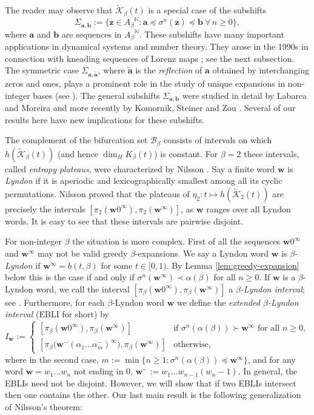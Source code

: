 \documentclass[11pt]{amsart}
\theoremstyle{definition}
\theoremstyle{remark}
\numberwithin{equation}{section}
\newcommand{\N}{\ensuremath{\mathbb{N}}}
\newcommand{\BB}{\mathscr{B}}
\newcommand{\Kt}{\widetilde{\mathcal{K}}}
\renewcommand{\a}{ {\mathbf{a}}}
\renewcommand{\b}{ {\mathbf{b}}}
\newcommand{\w}{\mathbf{w}}
\newcommand{\z}{\mathbf{z}}
\newcommand{\f}{\infty}
\newcommand{\al}{\alpha}
\newcommand{\lle}{\preccurlyeq}
\renewcommand{\a}{ \mathbf{a}}
\newcommand{\si}{\sigma}
\begin{document}
\medskip
The reader may observe that $\Kt_\beta(t)$ is a special case of the subshifts
\begin{equation} \label{eq:Sigma-ab}
\Sigma_{\a,\b}:=\{\z\in{A_\beta}^\N: \a\lle \si^n(\z)\lle \b\ \forall\,n\geq 0\},
\end{equation}
where $\a$ and $\b$ are sequences in ${A_\beta}^\N$. These subshifts have many important applications in dynamical systems and number theory. They arose in the 1990s in connection with kneading sequences of Lorenz maps \cite{Glendinning-Hall-1996,Glendinning-Sparrow-1993,Hubbard-Sparrow-1990}; see the next subsection. The symmetric case $\Sigma_{\a,\tilde{\a}}$, where $\tilde{\a}$ is the {\em reflection} of $\a$ obtained by interchanging zeros and ones, plays a prominent role in the study of unique expansions in non-integer bases (see \cite{AlcarazBarrera-Baker-Kong-2016, Allaart-2017, Allaart-Baker-Kong-17, Darczy_Katai_1995, DeVries_Komornik_2008, Erdos_Joo_Komornik_1990, Glendinning_Sidorov_2001, Komornik-Kong-Li-17}).  The general subshifts $\Sigma_{\a,\b}$ were studied in detail by Labarca and Moreira \cite{Labarca-Moreira-2006} and more recently by Komornik, Steiner and Zou \cite{Komornik-Steiner-Zou-2022}. Several of our results here have new implications for these subshifts.

The complement of the bifurcation set $\BB_\beta$ consists of intervals on which $h(\Kt_\beta(t))$ (and hence $\dim_H K_\beta(t)$) is constant. For $\beta=2$ these intervals, called {\em entropy plateaus}, were characterized by Nilsson \cite{Nilsson-2009}. Say a finite word $\w$ is {\em Lyndon} if it is aperiodic and lexicographically smallest among all its cyclic permutations. Nilsson proved that the plateaus of $\eta_2: t\mapsto h(\Kt_2(t))$ are precisely the intervals $[\pi_2(\w0^\f),\pi_2(\w^\f)]$, as $\w$ ranges over all Lyndon words. It is easy to see that these intervals are pairwise disjoint.

For {non-integer $\beta$} the situation is more complex. First of all the sequences $\w0^\f$ and $\w^\f$ may not be valid greedy $\beta$-expansions. We say a Lyndon word $\w$ is {\em $\beta$-Lyndon} if $\w^\f=b(t,\beta)$ for some $t\in[0,1)$. By Lemma \ref{lem:greedy-expansion} below this is the case if and only if $\si^n(\w^\f)\prec\al(\beta)$ for all $n\geq 0$. If $\w$ is a $\beta$-Lyndon word, we call the interval $[\pi_\beta(\w0^\f),\pi_\beta(\w^\f)]$ a {\em $\beta$-Lyndon interval}; see \cite[Definition 1.2]{Baker-Kong-2020}. Furthermore, for each $\beta$-Lyndon word $\w$ we define the {\em extended $\beta$-Lyndon interval} (EBLI for short) by
\[
I_\w:=\begin{cases}
[\pi_\beta(\w0^\f),\pi_\beta(\w^\f)] & \mbox{if $\si^n(\al(\beta))\succ \w^\f$ for all $n\geq 0$},\\
[\pi_\beta\big(\w^-(\al_1\dots\al_m^-)^\f\big),\pi_\beta(\w^\f)] & \mbox{otherwise},
\end{cases}
\]
where in the second case, $m:=\min\{n\geq 1: \si^n(\al(\beta))\lle \w^\f\}$, and for any word $\w=w_1\dots w_n$ {not ending in 0, $\w^-:=w_1\dots w_{n-1}(w_n-1)$}. In general, the EBLIs need not be disjoint. However, we will show that if two EBLIs intersect then one contains the other. Our last main result is the following generalization of Nilsson's theorem:
\end{document}
